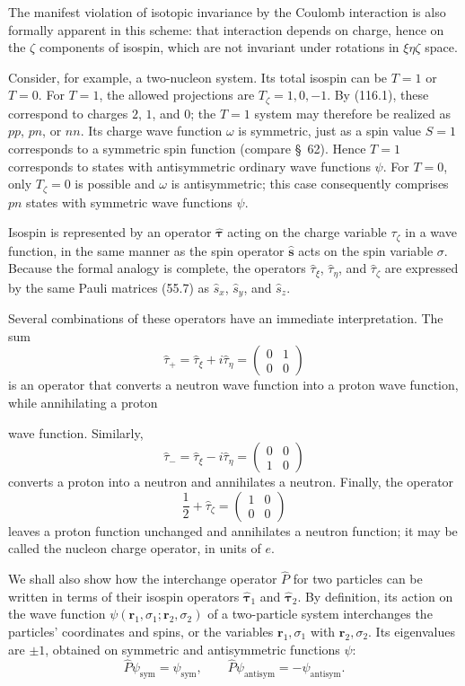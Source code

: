 The manifest violation of isotopic invariance by the Coulomb interaction is also formally apparent in this scheme: that interaction depends on charge, hence on the $\zeta$ components of isospin, which are not invariant under rotations in $\xi\eta\zeta$ space.

Consider, for example, a two-nucleon system. Its total isospin can be $T=1$ or $T=0$. For $T=1$, the allowed projections are $T_\zeta=1,0,-1$. By (116.1), these correspond to charges $2$, $1$, and $0$; the $T=1$ system may therefore be realized as $pp$, $pn$, or $nn$. Its charge wave function $\omega$ is symmetric, just as a spin value $S=1$ corresponds to a symmetric spin function (compare \S~62). Hence $T=1$ corresponds to states with antisymmetric ordinary wave functions $\psi$. For $T=0$, only $T_\zeta=0$ is possible and $\omega$ is antisymmetric; this case consequently comprises $pn$ states with symmetric wave functions $\psi$.

Isospin is represented by an operator $\hat{\boldsymbol\tau}$ acting on the charge variable $\tau_\zeta$ in a wave function, in the same manner as the spin operator $\hat{\mathbf s}$ acts on the spin variable $\sigma$. Because the formal analogy is complete, the operators $\hat\tau_\xi$, $\hat\tau_\eta$, and $\hat\tau_\zeta$ are expressed by the same Pauli matrices (55.7) as $\hat s_x$, $\hat s_y$, and $\hat s_z$.

Several combinations of these operators have an immediate interpretation. The sum
\[
 \hat\tau_+=\hat\tau_\xi+i\hat\tau_\eta=
 \begin{pmatrix}0&1\\0&0\end{pmatrix}
\]
is an operator that converts a neutron wave function into a proton wave function, while annihilating a proton

wave function. Similarly,
\[
 \hat\tau_-=\hat\tau_\xi-i\hat\tau_\eta=
 \begin{pmatrix}0&0\\1&0\end{pmatrix}
\]
converts a proton into a neutron and annihilates a neutron. Finally, the operator
\[
 \frac12+\hat\tau_\zeta=\begin{pmatrix}1&0\\0&0\end{pmatrix}
\]
leaves a proton function unchanged and annihilates a neutron function; it may be called the nucleon charge operator, in units of $e$.

We shall also show how the interchange operator $\hat P$ for two particles can be written in terms of their isospin operators $\hat{\boldsymbol\tau}_1$ and $\hat{\boldsymbol\tau}_2$. By definition, its action on the wave function $\psi(\mathbf r_1,\sigma_1;\mathbf r_2,\sigma_2)$ of a two-particle system interchanges the particles' coordinates and spins, or the variables $\mathbf r_1,\sigma_1$ with $\mathbf r_2,\sigma_2$. Its eigenvalues are $\pm1$, obtained on symmetric and antisymmetric functions $\psi$:
\begin{equation}
 \hat P\psi_{\mathrm{sym}}=\psi_{\mathrm{sym}},\qquad
 \hat P\psi_{\mathrm{antisym}}=-\psi_{\mathrm{antisym}}.
 \tag{116.2}
\end{equation}

